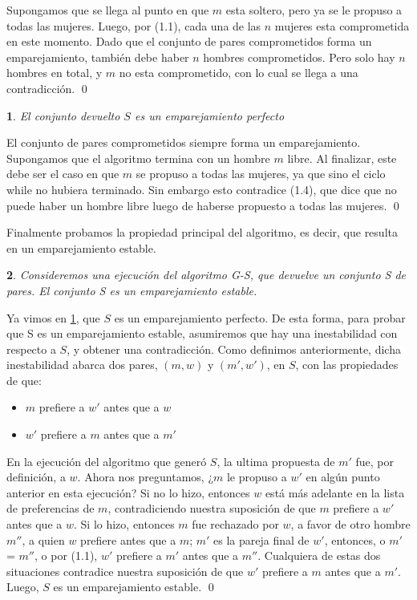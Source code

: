 \documentclass[a4paper, 12pt]{book}
\theoremstyle{dotless}
\newtheorem{theorem}{}%
\renewenvironment{proof}{{\noindent\bfseries Demostración.}}{\qed\vspace{12pt}}
\begin{document}
\begin{proof}
Supongamos que se llega al punto en que $m$ esta soltero, pero ya se le propuso a todas las mujeres. Luego, por (1.1), cada una de las $n$ mujeres esta comprometida en este momento. Dado que el conjunto de pares comprometidos forma un emparejamiento, también debe haber $n$ hombres comprometidos. Pero solo hay $n$ hombres en total, y $m$ no esta comprometido, con lo cual se llega a una contradicción. 
\end{proof}

\begin{theorem}
El conjunto devuelto $S$ es un emparejamiento perfecto
\label{thm:1.5}
\end{theorem}

\begin{proof}
El conjunto de pares comprometidos siempre forma un emparejamiento. Supongamos que el algoritmo termina con un hombre $m$ libre. Al finalizar, este debe ser el caso en que $m$ se propuso a todas las mujeres, ya que sino el ciclo while no hubiera terminado. Sin embargo esto contradice (1.4), que dice que no puede haber un hombre libre luego de haberse propuesto a todas las mujeres.
\end{proof}

Finalmente probamos la propiedad principal del algoritmo, es decir, que resulta en un emparejamiento estable.

\noindent\colorbox{mygray}{\parbox{0.98\textwidth}{
\begin{theorem}
Consideremos una ejecución del algoritmo G-S, que devuelve un conjunto S de pares. El conjunto S es un emparejamiento estable.
\end{theorem}
}}

\begin{proof}
Ya vimos en \ref{thm:1.5}, que $S$ es un emparejamiento perfecto. De esta forma, para probar que S es un emparejamiento estable, asumiremos que hay una inestabilidad con respecto a $S$, y obtener una contradicción. Como definimos anteriormente, dicha inestabilidad abarca dos pares, $(m,w)$ y $(m',w')$, en $S$, con las propiedades de que:

\begin{itemize}
    \item $m$ prefiere a $w'$ antes que a $w$ 
    \item $w'$ prefiere a $m$ antes que a $m'$
\end{itemize}
    
En la ejecución del algoritmo que generó $S$, la ultima propuesta de $m'$ fue, por definición, a $w$. Ahora nos preguntamos, ¿$m$ le propuso a $w'$ en algún punto anterior en esta ejecución? Si no lo hizo, entonces $w$ está más adelante en la lista de preferencias de $m$, contradiciendo nuestra suposición de que $m$ prefiere a $w'$ antes que a $w$. Si lo hizo, entonces $m$ fue rechazado por $w$, a favor de otro hombre $m''$, a quien $w$ prefiere antes que a $m$; $m'$ es la pareja final de $w'$, entonces, o $m'$ = $m''$, o por (1.1), $w'$ prefiere a $m'$ antes que a $m''$. Cualquiera de estas dos situaciones contradice nuestra suposición de que $w'$ prefiere a $m$ antes que a $m'$. Luego, $S$ es un emparejamiento estable. 
\end{proof} 
\end{document}

